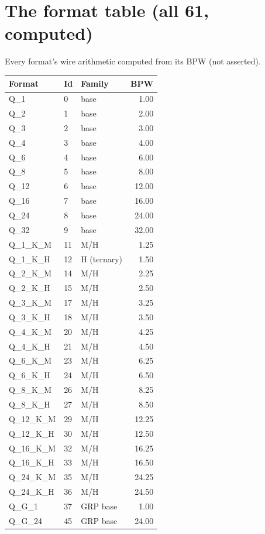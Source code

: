 \chapter{The format table (all 61, computed)}

Every format's wire arithmetic computed from its BPW (not asserted).

\begin{longtable}{@{}lllr@{}}
\toprule
Format & Id & Family & BPW\\
\midrule
\endhead
Q\_1 & 0 & base & 1.00\\
Q\_2 & 1 & base & 2.00\\
Q\_3 & 2 & base & 3.00\\
Q\_4 & 3 & base & 4.00\\
Q\_6 & 4 & base & 6.00\\
Q\_8 & 5 & base & 8.00\\
Q\_12 & 6 & base & 12.00\\
Q\_16 & 7 & base & 16.00\\
Q\_24 & 8 & base & 24.00\\
Q\_32 & 9 & base & 32.00\\
Q\_1\_K\_M & 11 & M/H & 1.25\\
Q\_1\_K\_H & 12 & H (ternary) & 1.50\\
Q\_2\_K\_M & 14 & M/H & 2.25\\
Q\_2\_K\_H & 15 & M/H & 2.50\\
Q\_3\_K\_M & 17 & M/H & 3.25\\
Q\_3\_K\_H & 18 & M/H & 3.50\\
Q\_4\_K\_M & 20 & M/H & 4.25\\
Q\_4\_K\_H & 21 & M/H & 4.50\\
Q\_6\_K\_M & 23 & M/H & 6.25\\
Q\_6\_K\_H & 24 & M/H & 6.50\\
Q\_8\_K\_M & 26 & M/H & 8.25\\
Q\_8\_K\_H & 27 & M/H & 8.50\\
Q\_12\_K\_M & 29 & M/H & 12.25\\
Q\_12\_K\_H & 30 & M/H & 12.50\\
Q\_16\_K\_M & 32 & M/H & 16.25\\
Q\_16\_K\_H & 33 & M/H & 16.50\\
Q\_24\_K\_M & 35 & M/H & 24.25\\
Q\_24\_K\_H & 36 & M/H & 24.50\\
Q\_G\_1 & 37 & GRP base & 1.00\\
Q\_G\_24 & 45 & GRP base & 24.00\\

\end{longtable}
